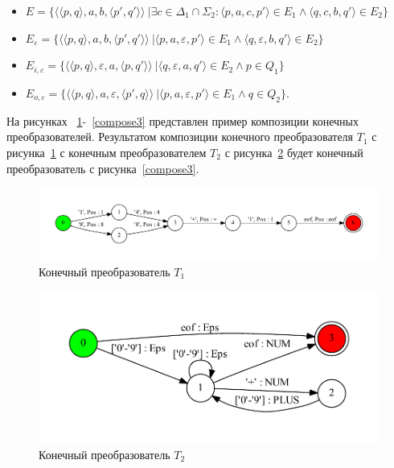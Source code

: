 \begin{itemize}
\item $E = \{ \langle \langle p, q \rangle, a, b, \langle p', q' \rangle \rangle\ | \exists c \in \Delta_1 \cap \Sigma_2 : \langle p, a, c, p' \rangle \in E_1 \wedge \langle q, c, b, q' \rangle \in E_2\}$
\item $E_{\varepsilon} = \{ \langle \langle p, q \rangle, a, b, \langle p', q' \rangle \rangle\ | \langle p, a, {\varepsilon}, p' \rangle \in E_1 \wedge \langle q, {\varepsilon}, b, q' \rangle \in E_2\}$
\item $E_{i, \varepsilon} = \{ \langle \langle p, q \rangle, {\varepsilon}, a, \langle p, q' \rangle \rangle\ | \langle q, {\varepsilon}, a, q' \rangle \in E_2 \wedge p \in Q_1 \} $
\item $E_{o, \varepsilon} = \{ \langle \langle p, q \rangle,  a, {\varepsilon}, \langle p', q \rangle \rangle\ | \langle p, a, {\varepsilon}, p' \rangle \in E_1 \wedge q \in Q_2 \}. $
\end{itemize}

На рисунках ~\ref{compose1}-~\ref{compose3} представлен пример композиции конечных преобразователей. Результатом композиции конечного преобразователя $T_1$ с рисунка~\ref{compose1} с конечным преобразователем $T_2$ с рисунка~\ref{compose2} будет конечный преобразователь с рисунка~\ref{compose3}.

\begin{figure}[h!]
        \includegraphics[width=\linewidth]{Gumin/pictures/example_.pdf}
        \caption{Конечный преобразователь $T_1$}
        \label{compose1} 
\end{figure}

\begin{figure}[h!]
        \includegraphics[width=\textwidth]{Gumin/pictures/lexer_.pdf}
        \caption{Конечный преобразователь $T_2$}
        \label{compose2} 
\end{figure}

